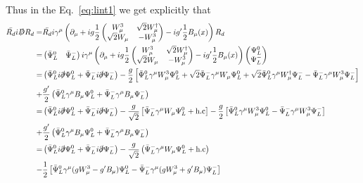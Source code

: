 Thus in the Eq.~\eqref{eq:lint1} we get explicitly that
\begin{align}
\label{eq:kinu}
\bar{R_d}i\slashed{D}R_d 
=&\bar{R_d}i\gamma^{\mu}\left(\partial_{\mu}
+ig\dfrac{1}{2}\begin{pmatrix}
W_{\mu}^3 & \sqrt{2}W_{\mu}^{\dagger} \\
\sqrt{2}W_{\mu} & -W_{\mu}^3
\end{pmatrix}
-ig'\dfrac{1}{2} B_{\mu}(x)\right)R_d\nonumber\\
=&\begin{pmatrix}
\bar{\Psi}_L^0 & \bar{\Psi}_L^-
\end{pmatrix} i\gamma^{\mu}\left(\partial_{\mu}
+ig\dfrac{1}{2}\begin{pmatrix}
W_{\mu}^3 & \sqrt{2}W_{\mu}^{\dagger} \\
\sqrt{2}W_{\mu} & -W_{\mu}^3
\end{pmatrix}
-ig'\dfrac{1}{2} B_{\mu}(x)\right)\begin{pmatrix}
\Psi_L^0 \\ \Psi_L^-
\end{pmatrix}\nonumber\\
=&\left(\bar{\Psi}_L^0i\slashed{\partial}\Psi_L^0+\bar{\Psi}_L^-i\slashed{\partial}\Psi_L^-\right)
-\dfrac{g}{2}\left[\bar{\Psi}_L^0\gamma^{\mu}W_{\mu}^3\Psi_L^0+\sqrt{2}\bar{\Psi}_L^-\gamma^{\mu}W_{\mu}\Psi_L^0
+\sqrt{2}\bar{\Psi}_L^0\gamma^{\mu}W_{\mu}^{\dagger}\Psi_L^--\bar{\Psi}_L^-\gamma^{\mu}W_{\mu}^3\Psi_L^-\right]
\nonumber\\
+&\dfrac{g'}{2}\left(\bar{\Psi}_L^0\gamma^{\mu}B_{\mu}\Psi_L^0+\bar{\Psi}_L^-\gamma^{\mu}B_{\mu}\Psi_L^-\right)
\nonumber\\
=&\left(\bar{\Psi}_L^0i\slashed{\partial}\Psi_L^0+\bar{\Psi}_L^-i\slashed{\partial}\Psi_L^-\right)
-\dfrac{g}{\sqrt{2}}\left[\bar{\Psi}_L^-\gamma^{\mu}W_{\mu}\Psi_L^0
+\text{h.c}\right] - \dfrac{g}{2}\left[\bar{\Psi}_L^0\gamma^{\mu}W_{\mu}^3\Psi_L^0-\bar{\Psi}_L^-\gamma^{\mu}W_{\mu}^3\Psi_L^-\right]
\nonumber\\
+&\dfrac{g'}{2}\left(\bar{\Psi}_L^0\gamma^{\mu}B_{\mu}\Psi_L^0+\bar{\Psi}_L^-\gamma^{\mu}B_{\mu}\Psi_L^-\right)\nonumber\\
=&\left(\bar{\Psi}_L^0i\slashed{\partial}\Psi_L^0+\bar{\Psi}_L^-i\slashed{\partial}\Psi_L^-\right)
-\dfrac{g}{\sqrt{2}}\left(\bar{\Psi}_L^-\gamma^{\mu}W_{\mu}\Psi_L^0
+\text{h.c}\right)\nonumber\\
-& \dfrac{1}{2}\left[\bar{\Psi}_L^0\gamma^{\mu}(gW_{\mu}^3-g'B_{\mu})\Psi_L^0-\bar{\Psi}_L^-\gamma^{\mu}(gW_{\mu}^3+g'B_{\mu})\Psi_L^-\right]

\end{align}
